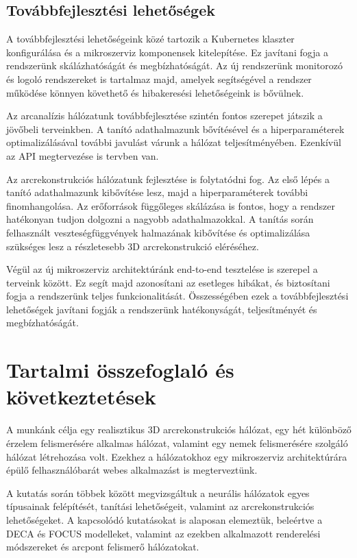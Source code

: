 \documentclass[12pt,a4]{article}
\begin{document}
        \subsection{Továbbfejlesztési lehetőségek}

        A továbbfejlesztési lehetőségeink közé tartozik a Kubernetes klaszter konfigurálása és a mikroszerviz komponensek kitelepítése. Ez javítani fogja a rendszerünk skálázhatóságát és megbízhatóságát. Az új rendszerünk monitorozó és logoló rendszereket is tartalmaz majd, amelyek segítségével a rendszer működése könnyen követhető és hibakeresési lehetőségeink is bővülnek.

        Az arcanalízis hálózatunk továbbfejlesztése szintén fontos szerepet játszik a jövőbeli terveinkben. A tanító adathalmazunk bővítésével és a hiperparaméterek optimalizálásával további javulást várunk a hálózat teljesítményében. Ezenkívül az API megtervezése is tervben van.

        Az arcrekonstrukciós hálózatunk fejlesztése is folytatódni fog. Az első lépés a tanító adathalmazunk kibővítése lesz, majd a hiperparaméterek további finomhangolása. Az erőforrások függőleges skálázása is fontos, hogy a rendszer hatékonyan tudjon dolgozni a nagyobb adathalmazokkal. A tanítás során felhasznált veszteségfüggvények halmazának kibővítése és optimalizálása szükséges lesz a részletesebb 3D arcrekonstrukció eléréséhez.

        Végül az új mikroszerviz architektúránk end-to-end tesztelése is szerepel a terveink között. Ez segít majd azonosítani az esetleges hibákat, és biztosítani fogja a rendszerünk teljes funkcionalitását. Összességében ezek a továbbfejlesztési lehetőségek javítani fogják a rendszerünk hatékonyságát, teljesítményét és megbízhatóságát.

    \section{Tartalmi összefoglaló és következtetések}

        A munkánk célja egy realisztikus 3D arcrekonstrukciós hálózat, egy hét különböző érzelem felismerésére alkalmas hálózat, valamint egy nemek felismerésére szolgáló hálózat létrehozása volt. Ezekhez a hálózatokhoz egy mikroszerviz architektúrára épülő felhasználóbarát webes alkalmazást is megterveztünk.
        
        A kutatás során többek között megvizsgáltuk a neurális hálózatok egyes típusainak felépítését, tanítási lehetőségeit, valamint az arcrekonstrukciós lehetőségeket. A kapcsolódó kutatásokat is alaposan elemeztük, beleértve a DECA és FOCUS modelleket, valamint az ezekben alkalmazott renderelési módszereket és arcpont felismerő hálózatokat.
        
\end{document}
